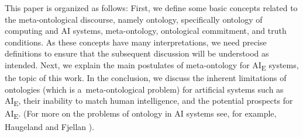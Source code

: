 {{This paper is organized as follows: First, we define some basic concepts related to the meta-ontological discourse, namely ontology, specifically ontology of computing and AI systems, meta-ontology, ontological commitment, and truth conditions. As these concepts have many interpretations, we need precise definitions to ensure that the subsequent discussion will be understood as intended. Next, we explain the main postulates of meta-ontology for AI\textsubscript{E} systems, the topic of this work. In the conclusion, we discuss the inherent limitations of ontologies (which is a~meta-ontological problem) for artificial systems such as AI\textsubscript{E}, their inability to match human intelligence, and the potential prospects for AI\textsubscript{E}. (For more on the problems of ontology in AI systems see, for example, Haugeland
\parencite*[][]{haugeland_artificial_1985} %
 and Fjellan 
\parencite*[][]{fjelland_why_2020}%
).

}}
